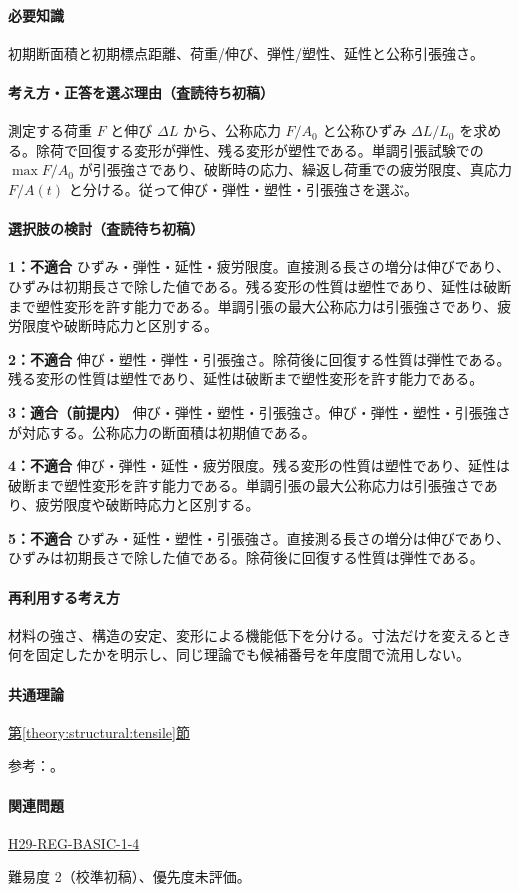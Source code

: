 \paragraph{必要知識} 初期断面積と初期標点距離、荷重/伸び、弾性/塑性、延性と公称引張強さ。

\paragraph{考え方・正答を選ぶ理由（査読待ち初稿）} 測定する荷重 \(F\) と伸び \(\Delta L\) から、公称応力 \(F/A_0\) と公称ひずみ \(\Delta L/L_0\) を求める。除荷で回復する変形が弾性、残る変形が塑性である。単調引張試験での \(\max F/A_0\) が引張強さであり、破断時の応力、繰返し荷重での疲労限度、真応力 \(F/A(t)\) と分ける。従って伸び・弾性・塑性・引張強さを選ぶ。

\paragraph{選択肢の検討（査読待ち初稿）}\mbox{}\par

\noindent\textbf{1：不適合} ひずみ・弾性・延性・疲労限度。直接測る長さの増分は伸びであり、ひずみは初期長さで除した値である。残る変形の性質は塑性であり、延性は破断まで塑性変形を許す能力である。単調引張の最大公称応力は引張強さであり、疲労限度や破断時応力と区別する。\par

\noindent\textbf{2：不適合} 伸び・塑性・弾性・引張強さ。除荷後に回復する性質は弾性である。残る変形の性質は塑性であり、延性は破断まで塑性変形を許す能力である。\par

\noindent\textbf{3：適合（前提内）} 伸び・弾性・塑性・引張強さ。伸び・弾性・塑性・引張強さが対応する。公称応力の断面積は初期値である。\par

\noindent\textbf{4：不適合} 伸び・弾性・延性・疲労限度。残る変形の性質は塑性であり、延性は破断まで塑性変形を許す能力である。単調引張の最大公称応力は引張強さであり、疲労限度や破断時応力と区別する。\par

\noindent\textbf{5：不適合} ひずみ・延性・塑性・引張強さ。直接測る長さの増分は伸びであり、ひずみは初期長さで除した値である。除荷後に回復する性質は弾性である。\par

\paragraph{再利用する考え方} 材料の強さ、構造の安定、変形による機能低下を分ける。寸法だけを変えるとき何を固定したかを明示し、同じ理論でも候補番号を年度間で流用しない。

\paragraph{共通理論} \hyperref[theory:structural:tensile]{第\ref*{theory:structural:tensile}節}

\par 参考：\cite{struct_mit_beam,struct_mit_buckling,struct_mlit_limit}。

\paragraph{関連問題} \hyperref[q:h29-reg-basic-1-4]{H29-REG-BASIC-1-4}

\par 難易度 2（校準初稿）、優先度未評価。

